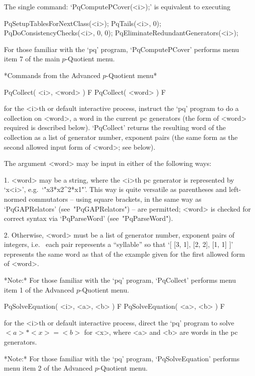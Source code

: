 The single command: `PqComputePCover(<i>);' is equivalent to executing

PqSetupTablesForNextClass(<i>);
PqTails(<i>, 0);
PqDoConsistencyChecks(<i>, 0, 0);
PqEliminateRedundantGenerators(<i>);

For those familiar with the `pq' program, `PqComputePCover' performs  menu
item 7 of the main $p$-Quotient menu.

*Commands from the Advanced $p$-Quotient menu*

\>PqCollect( <i>, <word> ) F
\>PqCollect( <word> ) F

for the <i>th or default interactive {\ANUPQ} process, instruct the  `pq'
program to do a collection on <word>, a word in the current pc generators
(the form of <word> required is described below). `PqCollect' returns the
resulting word of the collection as a list of generator number,  exponent
pairs (the same form as the second allowed  input  form  of  <word>;  see
below).

The argument <word> may be input in either of the following ways:

\beginlist%

\item{1.}
<word> may be a string, where the <i>th pc generator  is  represented  by
`x<i>', e.g.~`"x3*x2^2*x1"'. This way is quite versatile  as  parentheses
and left-normed commutators -- using square brackets, in the same way  as
`PqGAPRelators' (see~"PqGAPRelators") -- are permitted; <word> is checked
for correct syntax via `PqParseWord' (see~"PqParseWord").

\item{2.}
Otherwise, <word> must be a list of generator number, exponent  pairs  of
integers, i.e.~ each pair represents a ``syllable'' so that  `[  [3,  1],
[2, 2], [1, 1] ]' represents the same word as that of the  example  given
for the first allowed form of <word>.

\endlist

*Note:* For those familiar with the  `pq'  program,  `PqCollect'  performs
menu item 1 of the Advanced $p$-Quotient menu.

\>PqSolveEquation( <i>, <a>, <b> ) F
\>PqSolveEquation( <a>, <b> ) F

for the <i>th or default interactive {\ANUPQ} process,  direct  the  `pq'
program to solve $<a> * <x> = <b>$ for <x>, where <a> and <b> are words in
the pc generators.

*Note:* 
For those familiar  with  the  `pq'  program,  `PqSolveEquation'  performs
menu item 2 of the Advanced $p$-Quotient menu.

